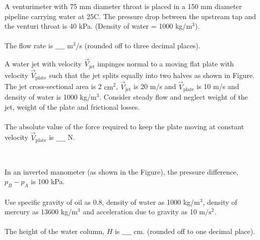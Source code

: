 \iffalse
\chapter{2020}
\author{AI24BTECH11009}
\section{xe}
\fi

\item A venturimeter with 75 mm diameter throat is placed in a 150 mm diameter pipeline carrying water at 25\degree C. The pressure drop between the upstream tap and the venturi throat is 40 kPa. (Density of water = 1000 kg/$\text{m}^3$). \\\\
The flow rate is $\_\_\_\_$ $\text{m}^3$/s (rounded off to three decimal places). \\
\item A water jet with velocity $\overrightarrow{V}_{\text{jet}}$ impinges normal to a moving flat plate with velocity $\overrightarrow{V}_{\text{plate}}$ such that the jet splits equally into two halves as shown in Figure. The jet cross-sectional area is 2 $\text{cm}^2$, $\overrightarrow{V}_{\text{jet}}$ is 20 m/s and $\overrightarrow{V}_{\text{plate}}$ is 10 m/s and density of water is 1000 kg/$\text{m}^3$. Consider steady flow and neglect weight of the jet, weight of the plate and frictional losses. \\\\
The absolute value of the force required to keep the plate moving at constant velocity $\overrightarrow{V}_{\text{plate}}$ is $\_\_\_\_$ N.
\begin{figure}[!ht]
\centering
\resizebox{0.5\textwidth}{!}{%

}%
\end{figure}\\
\item In an inverted manometer (as shown in the Figure), the pressure difference, $p_B - p_A$ is 100 kPa.\\\\
Use specific gravity of oil as 0.8, density of water as 1000 kg/$\text{m}^3$, density of mercury as 13600 kg/$\text{m}^3$ and acceleration due to gravity as 10 m/$\text{s}^2$. \\\\
The height of the water column, $H$ is $\_\_\_\_$ cm. (rounded off to one decimal place). \\
\begin{figure}[!ht]
\centering
\resizebox{0.5\textwidth}{!}{%

}%
\end{figure}
